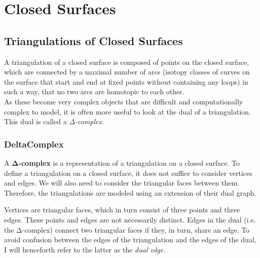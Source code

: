 

\part{Closed Surfaces}


\chapter{Triangulations of Closed Surfaces}



\label{11880348436537269946}{}




A triangulation of a closed surface is composed of points on the closed surface, which are connected by a maximal number of arcs (isotopy classes of curves on the surface that start and end at fixed points without containing any loops) in such a way, that no two arcs are homotopic to each other.\\
As these become very complex objects that are difficult and computationally complex to model, it is often more useful to look at the dual of a triangulation. This dual is called a \emph{Δ-complex}. 



\section{DeltaComplex}



\label{13627494553398038653}{}


A \textbf{Δ-complex} is a representation of a triangulation on a closed surface. To define a triangulation on a closed surface, it does not suffice to consider vertices and edges. We will also need to consider the triangular faces between them. Therefore, the triangulations are modeled using an extension of their dual graph.



Vertices are triangular faces, which in turn consist of three points and three edges. These points and edges are not necessarily distinct. Edges in the dual (i.e. the Δ-complex) connect two triangular faces if they, in turn, share an edge. To avoid confusion between the edges of the triangulation and the edges of the dual, I will henceforth refer to the latter as the \emph{dual edge}.




